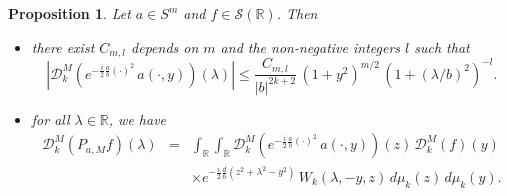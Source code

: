 \documentclass[12pt,a4paper,reqno]{amsproc}
\newtheorem{proposition}[theorem]{Proposition}
\theoremstyle{definition}
\theoremstyle{remark}
\numberwithin{equation}{section}
\begin{document}
\begin{proposition}\label{C7-p3.4}
 Let $a\in S^m$ and $f\in \mathcal{S}(\mathbb{R})$. Then
 \begin{itemize}
\item[$(i)$] there exist $C_{m,l}$ depends on $m$ and the non-negative integers $l$ such that
\begin{equation*}
\left|\mathcal{D}_k^M\left(e^{-\frac{i}{2}\frac{a}{b}(\cdot)^2}\,a(\cdot,y)\right)(\lambda) \right|\le \frac{C_{m,l}}{|b|^{2k+2}}\,(1+y^2)^{m/2}\,(1+(\lambda/b)^2)^{-l}.      
\end{equation*}
\item[$(ii)$] for all $\lambda \in \mathbb{R}$, we have
\begin{eqnarray*}
\mathcal{D}_k^M(P_{a,M}f)(\lambda) &=& \int_{\mathbb{R}}\int_{\mathbb{R}} \mathcal{D}_k^M\left(e^{-\frac{i}{2}\frac{a}{b}(\cdot)^2}\,a(\cdot,y)\right)(z)\,\mathcal{D}_k^M(f)(y)\\
 &&\times e^{-\frac{i}{2}\frac{d}{b}(z^2+\lambda^2-y^2)}\,W_k(\lambda,-y,z)\,d\mu_k(z)\,d\mu_k(y).
\end{eqnarray*}
\end{itemize}
\end{proposition}
\end{document}
